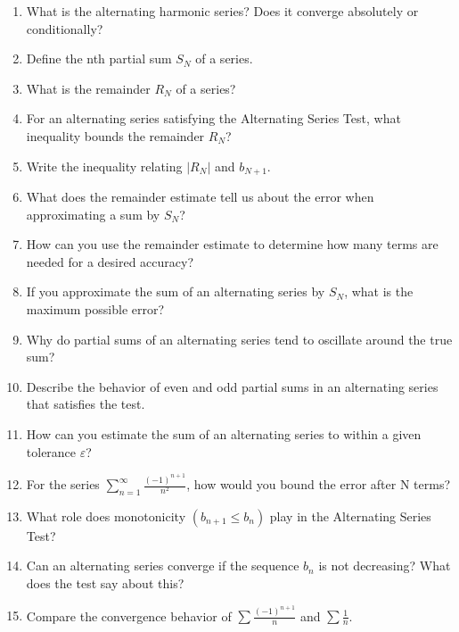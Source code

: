 \begin{enumerate}
\item What is the alternating harmonic series? Does it converge absolutely or conditionally?

\item Define the nth partial sum $S_N$ of a series.

\item What is the remainder $R_N$ of a series?

\item For an alternating series satisfying the Alternating Series Test, what inequality bounds the remainder $R_N$?

\item Write the inequality relating $|R_N|$ and $b_{N+1}$.

\item What does the remainder estimate tell us about the error when approximating a sum by $S_N$?

\item How can you use the remainder estimate to determine how many terms are needed for a desired accuracy?

\item If you approximate the sum of an alternating series by $S_N$, what is the maximum possible error?

\item Why do partial sums of an alternating series tend to oscillate around the true sum?

\item Describe the behavior of even and odd partial sums in an alternating series that satisfies the test.

\item How can you estimate the sum of an alternating series to within a given tolerance $\varepsilon$?

\item For the series $\sum_{n=1}^{\infty} \frac{(-1)^{n+1}}{n^2}$, how would you bound the error after N terms?

\item What role does monotonicity $(b_{n+1} \le b_n)$ play in the Alternating Series Test?

\item Can an alternating series converge if the sequence $b_n$ is not decreasing? What does the test say about this?

\item Compare the convergence behavior of $\sum \frac{(-1)^{n+1}}{n}$ and $\sum \frac{1}{n}$.


\end{enumerate}
